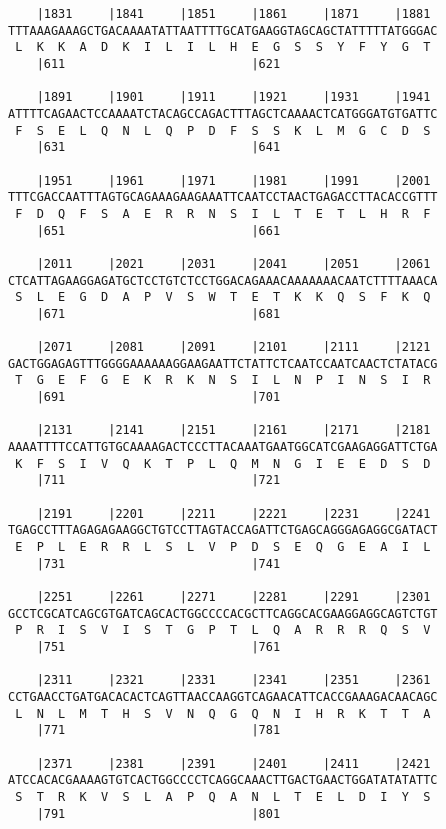 \documentclass{article}
\begin{document}
\begin{Verbatim}
    |1831     |1841     |1851     |1861     |1871     |1881 
TTTAAAGAAAGCTGACAAAATATTAATTTTGCATGAAGGTAGCAGCTATTTTTATGGGAC
 L  K  K  A  D  K  I  L  I  L  H  E  G  S  S  Y  F  Y  G  T 
    |611                          |621                      
  
    |1891     |1901     |1911     |1921     |1931     |1941 
ATTTTCAGAACTCCAAAATCTACAGCCAGACTTTAGCTCAAAACTCATGGGATGTGATTC
 F  S  E  L  Q  N  L  Q  P  D  F  S  S  K  L  M  G  C  D  S 
    |631                          |641                      
  
    |1951     |1961     |1971     |1981     |1991     |2001 
TTTCGACCAATTTAGTGCAGAAAGAAGAAATTCAATCCTAACTGAGACCTTACACCGTTT
 F  D  Q  F  S  A  E  R  R  N  S  I  L  T  E  T  L  H  R  F 
    |651                          |661                      
  
    |2011     |2021     |2031     |2041     |2051     |2061 
CTCATTAGAAGGAGATGCTCCTGTCTCCTGGACAGAAACAAAAAAACAATCTTTTAAACA
 S  L  E  G  D  A  P  V  S  W  T  E  T  K  K  Q  S  F  K  Q 
    |671                          |681                      
  
    |2071     |2081     |2091     |2101     |2111     |2121 
GACTGGAGAGTTTGGGGAAAAAAGGAAGAATTCTATTCTCAATCCAATCAACTCTATACG
 T  G  E  F  G  E  K  R  K  N  S  I  L  N  P  I  N  S  I  R 
    |691                          |701                      
  
    |2131     |2141     |2151     |2161     |2171     |2181 
AAAATTTTCCATTGTGCAAAAGACTCCCTTACAAATGAATGGCATCGAAGAGGATTCTGA
 K  F  S  I  V  Q  K  T  P  L  Q  M  N  G  I  E  E  D  S  D 
    |711                          |721                      
  
    |2191     |2201     |2211     |2221     |2231     |2241 
TGAGCCTTTAGAGAGAAGGCTGTCCTTAGTACCAGATTCTGAGCAGGGAGAGGCGATACT
 E  P  L  E  R  R  L  S  L  V  P  D  S  E  Q  G  E  A  I  L 
    |731                          |741                      
  
    |2251     |2261     |2271     |2281     |2291     |2301 
GCCTCGCATCAGCGTGATCAGCACTGGCCCCACGCTTCAGGCACGAAGGAGGCAGTCTGT
 P  R  I  S  V  I  S  T  G  P  T  L  Q  A  R  R  R  Q  S  V 
    |751                          |761                      
  
    |2311     |2321     |2331     |2341     |2351     |2361 
CCTGAACCTGATGACACACTCAGTTAACCAAGGTCAGAACATTCACCGAAAGACAACAGC
 L  N  L  M  T  H  S  V  N  Q  G  Q  N  I  H  R  K  T  T  A 
    |771                          |781                      
  
    |2371     |2381     |2391     |2401     |2411     |2421 
ATCCACACGAAAAGTGTCACTGGCCCCTCAGGCAAACTTGACTGAACTGGATATATATTC
 S  T  R  K  V  S  L  A  P  Q  A  N  L  T  E  L  D  I  Y  S 
    |791                          |801                      
  

\end{Verbatim}
\end{document}
